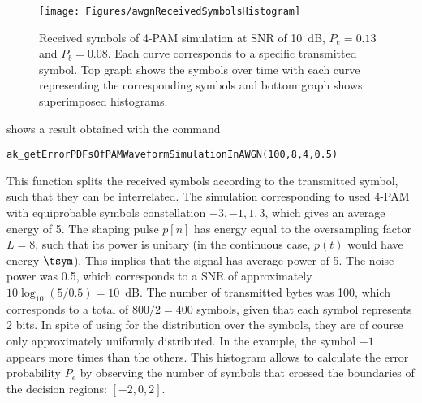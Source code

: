 \begin{figure}[htbp]
\centering
\texttt{[image: Figures/awgnReceivedSymbolsHistogram]}
\caption[{Received symbols of 4-PAM simulation at SNR of 10~dB, $P_e=0.13$ and $P_b=0.08$.}]{Received symbols of 4-PAM simulation at SNR of 10~dB, $P_e=0.13$ and $P_b=0.08$. Each curve corresponds to a specific transmitted symbol. Top graph shows the symbols over time with each curve representing the corresponding symbols and bottom graph shows superimposed histograms.\label{fig:awgnReceivedSymbolsHistogram}}
\end{figure}

 shows a result obtained with the command
\begin{lstlisting}
ak_getErrorPDFsOfPAMWaveformSimulationInAWGN(100,8,4,0.5)
\end{lstlisting}
This function splits the received symbols according to the transmitted symbol, such that they can be interrelated. The simulation corresponding to  used 4-PAM with equiprobable symbols constellation $-3,-1,1,3$, which gives an average energy of 5. The shaping pulse $p[n]$ has energy equal to the oversampling factor $L=8$, such that its power is unitary (in the continuous case, $p(t)$ would have energy $\tsym$). This implies that the signal has average power of 5. The noise power was 0.5, which corresponds to 
a SNR of approximately $10 \log_{10} (5/0.5) = 10$~dB. The number of transmitted bytes was 100, which corresponds to a total of $800 / 2 = 400$ symbols, given that each symbol represents 2 bits. In spite of using  for the distribution over the symbols, they are of course only approximately uniformly distributed. In the example, the symbol $-1$ appears more times than the others. This histogram allows to calculate the error probability $P_e$ by observing the number of symbols that crossed the boundaries of the decision regions: $[-2, 0, 2]$.

